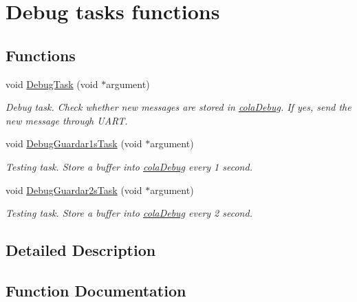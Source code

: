 \hypertarget{group___debug___exported___functions___group2}{}\section{Debug tasks functions}
\label{group___debug___exported___functions___group2}
\subsection*{Functions}
\begin{DoxyCompactItemize}
\item 
void \hyperlink{group___debug___exported___functions___group2_ga0e7fca846e34e06a1f62249fe8a30a44}{Debug\+Task} (void $\ast$argument)
\begin{DoxyCompactList}\small\item\em Debug task. Check whether new messages are stored in \hyperlink{group___cola_ga314fd637d927bd6a2551e119de623aa5}{cola\+Debug}. If yes, send the new message through U\+A\+RT. \end{DoxyCompactList}\item 
void \hyperlink{group___debug___exported___functions___group2_ga5e54537eed1694dae3ea8e6cce3f9b3a}{Debug\+Guardar1s\+Task} (void $\ast$argument)
\begin{DoxyCompactList}\small\item\em Testing task. Store a buffer into \hyperlink{group___cola_ga314fd637d927bd6a2551e119de623aa5}{cola\+Debug} every 1 second. \end{DoxyCompactList}\item 
void \hyperlink{group___debug___exported___functions___group2_gadc8fe8277ada7992dddff220a145eb5f}{Debug\+Guardar2s\+Task} (void $\ast$argument)
\begin{DoxyCompactList}\small\item\em Testing task. Store a buffer into \hyperlink{group___cola_ga314fd637d927bd6a2551e119de623aa5}{cola\+Debug} every 2 second. \end{DoxyCompactList}\end{DoxyCompactItemize}


\subsection{Detailed Description}


\subsection{Function Documentation}
